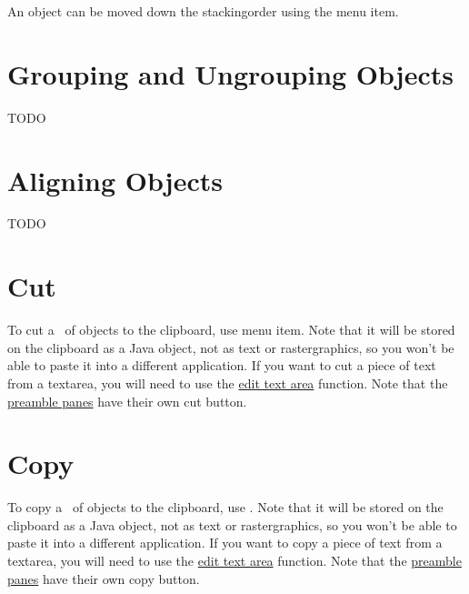 
An object can be moved down the \gls{stackingorder} using
the  menu item.


\section{Grouping and Ungrouping Objects}\label{sec:grouping}



TODO

\section{Aligning Objects}\label{sec:alignobjects}





TODO


\section{Cut}\label{sec:cutobjects}


To cut a \selection\ of \glspl{object} to the
clipboard, use  menu item. Note that it will be stored
on the clipboard as a  Java object, not as text or
\gls{rastergraphics}, so you won't be able to paste it into a different
application.  If you want to cut a piece of text
from a \gls{textarea}, you will need to use the
\hyperref[sec:edittext]{edit text area} function.
Note that the \hyperref[sec:preamble]{preamble panes} have
their own cut button.

\section{Copy}\label{sec:copyobjects}


To copy a \selection\ of \glspl{object} to the
clipboard, use . Note that it will be stored
on the clipboard as a  Java object, not as text or
\gls{rastergraphics}, so you won't be able to paste it into a different
application.  If you want to copy a piece of text from a
\gls{textarea}, you will need to use the
\hyperref[sec:edittext]{edit text area} function.
Note that the \hyperref[sec:preamble]{preamble panes} have
their own copy button.

